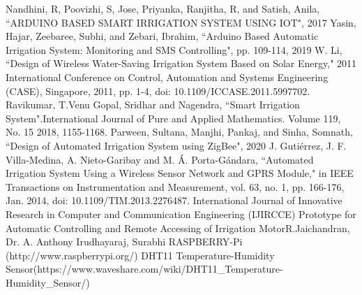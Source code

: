 \documentclass[conference]{IEEEtran}
\begin{document}
	
	\begin{thebibliography}{00}
		Nandhini, R, Poovizhi, S, Jose, Priyanka, Ranjitha, R, and Satish, Anila, ``ARDUINO BASED SMART IRRIGATION SYSTEM USING IOT", 2017
		 Yasin, Hajar, Zeebaree, Subhi, and Zebari, Ibrahim, ``Arduino Based Automatic Irrigation System: Monitoring and SMS Controlling", pp. 109-114, 2019
		W. Li, ``Design of Wireless Water-Saving Irrigation System Based on Solar Energy," 2011 International Conference on Control, Automation and Systems Engineering (CASE), Singapore, 2011, pp. 1-4, doi: 10.1109/ICCASE.2011.5997702.
		Ravikumar, T.Venu Gopal, Sridhar and Nagendra, ``Smart Irrigation System".International Journal of Pure and Applied Mathematics. Volume 119, No. 15 2018, 1155-1168.
		Parween, Sultana, Manjhi, Pankaj, and Sinha, Somnath, ``Design of Automated Irrigation System using ZigBee", 2020
		J. Gutiérrez, J. F. Villa-Medina, A. Nieto-Garibay and M. Á. Porta-Gándara, ``Automated Irrigation System Using a Wireless Sensor Network and GPRS Module," in IEEE Transactions on Instrumentation and Measurement, vol. 63, no. 1, pp. 166-176, Jan. 2014, doi: 10.1109/TIM.2013.2276487.
		International Journal of Innovative Research in Computer and 
		Communication Engineering (IJIRCCE) Prototype for Automatic 
		Controlling and Remote Accessing of Irrigation MotorR.Jaichandran, Dr. A. Anthony Irudhayaraj, Surabhi
		RASPBERRY-Pi (http://www.raspberrypi.org/)
		DHT11 Temperature-Humidity Sensor(https://www.waveshare.com/wiki/DHT11\_Temperature-Humidity\_Sensor/)		
	\end{thebibliography}
	
\end{document}
